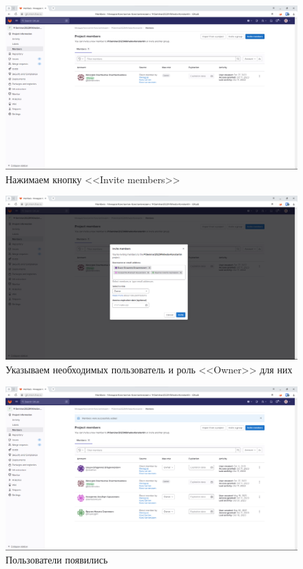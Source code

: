 \documentclass[a4paper]{article}
\begin{document}
  \begin{figure}[H]
    \centering
    \includegraphics[width=\textwidth]{1_ (54)}
    \caption{Нажимаем кнопку <<Invite members>>}
  \end{figure}

  \begin{figure}[H]
    \centering
    \includegraphics[width=\textwidth]{1_ (52)}
    \caption{Указываем необходимых пользователь и роль <<Owner>> для них}
  \end{figure}

  \begin{figure}[H]
    \centering
    \includegraphics[width=\textwidth]{1_ (51)}
    \caption{Пользователи появились}
  \end{figure}
\end{document}

